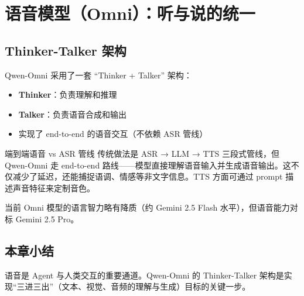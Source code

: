 \section{语音模型（Omni）：听与说的统一}

\subsection{Thinker-Talker 架构}

Qwen-Omni 采用了一套 ``Thinker + Talker'' 架构：

\begin{itemize}
    \item \textbf{Thinker}：负责理解和推理
    \item \textbf{Talker}：负责语音合成和输出
    \item 实现了 end-to-end 的语音交互（不依赖 ASR 管线）
\end{itemize}

\begin{knowledgebox}{端到端语音 vs ASR 管线}
传统做法是 ASR → LLM → TTS 三段式管线，但 Qwen-Omni 走 end-to-end 路线——模型直接理解语音输入并生成语音输出。这不仅减少了延迟，还能捕捉语调、情感等非文字信息。TTS 方面可通过 prompt 描述声音特征来定制音色。
\end{knowledgebox}

当前 Omni 模型的语言智力略有降质（约 Gemini 2.5 Flash 水平），但语音能力对标 Gemini 2.5 Pro。

\subsection{本章小结}

语音是 Agent 与人类交互的重要通道。Qwen-Omni 的 Thinker-Talker 架构是实现``三进三出''（文本、视觉、音频的理解与生成）目标的关键一步。

